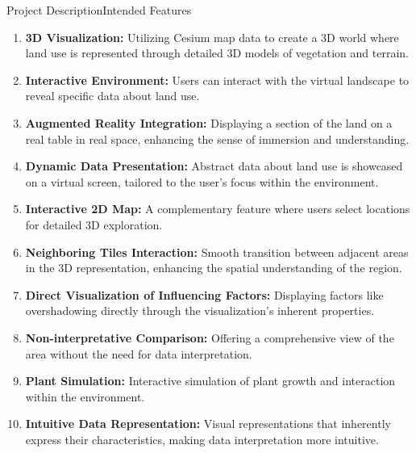 \documentclass[t,aspectratio=169,divpsnames]{beamer}
\begin{document}
\begin{frame}{Project Description}{Intended Features}

\scriptsize
\begin{enumerate}
    \item \textbf{3D Visualization:} Utilizing Cesium map data to create a 3D world where land use is represented through detailed 3D models of vegetation and terrain.
    \item \textbf{Interactive Environment:} Users can interact with the virtual landscape to reveal specific data about land use.
    \item \textbf{Augmented Reality Integration:} Displaying a section of the land on a real table in real space, enhancing the sense of immersion and understanding.
    \item \textbf{Dynamic Data Presentation:} Abstract data about land use is showcased on a virtual screen, tailored to the user's focus within the environment.
    \item \textbf{Interactive 2D Map:} A complementary feature where users select locations for detailed 3D exploration.
    \item \textbf{Neighboring Tiles Interaction:} Smooth transition between adjacent areas in the 3D representation, enhancing the spatial understanding of the region.
    \item \textbf{Direct Visualization of Influencing Factors:} Displaying factors like overshadowing directly through the visualization's inherent properties.
    \item \textbf{Non-interpretative Comparison:} Offering a comprehensive view of the area without the need for data interpretation.
    \item \textbf{Plant Simulation:} Interactive simulation of plant growth and interaction within the environment.
    \item \textbf{Intuitive Data Representation:} Visual representations that inherently express their characteristics, making data interpretation more intuitive.
\end{enumerate}
\end{frame}
\end{document}
